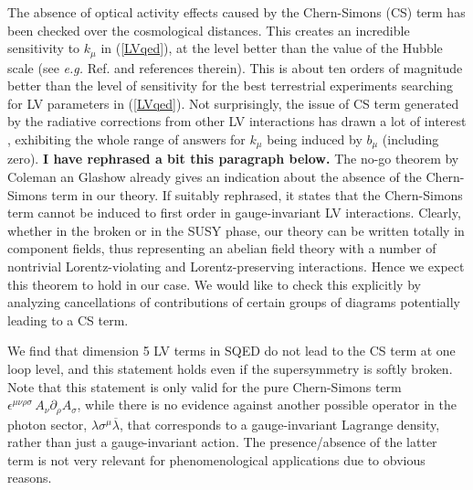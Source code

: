 \documentclass[12pt]{revtex4}
\begin{document}
    The absence of optical activity effects caused by the Chern-Simons (CS) term 
    has been checked over the cosmological distances. This creates an 
    incredible sensitivity to $k_\mu$ in (\ref{LVqed}), at the level better 
    than the value of the Hubble scale (see {\em e.g.} Ref. \cite{CFJ} and references therein). 
   This is about ten orders of magnitude 
    better than the level of sensitivity for the best terrestrial experiments searching for 
    LV parameters in (\ref{LVqed}). Not surprisingly, the issue of 
CS term generated by the radiative corrections from other LV interactions 
    has drawn a lot of interest \cite{CG,Jackiw:1999yp,Chung:1998jv,Andrianov:2001zj}, 
    exhibiting the whole range of answers for $k_\mu$ being induced by $b_\mu$ 
(including zero). 
    {\bf I have rephrased a bit this paragraph below.}
    The no-go theorem by Coleman an Glashow \cite{CG} already gives an indication
    about the absence of the Chern-Simons term in our theory. 
    If suitably rephrased, it states that
    the Chern-Simons term cannot be induced to first order in gauge-invariant
    LV interactions.
    Clearly, whether in the broken or in the SUSY phase, our theory can be written totally
    in component fields, thus representing an abelian field theory with a number of nontrivial
    Lorentz-violating and Lorentz-preserving interactions.
    Hence we expect this theorem 
    to hold in our case. 
    We would like to check this explicitly by analyzing cancellations of contributions
    of certain groups of diagrams potentially leading to a CS term. 

	We find that dimension 5 LV terms in SQED do not lead to the CS term at one loop level,
	and this statement holds even if the supersymmetry is softly broken.
 Note that this statement is only valid for the pure Chern-Simons term
$ \epsilon^{\mu\nu\rho\sigma}\, A_\nu \partial_\rho A_\sigma $, 
while there is no evidence against another possible operator in the 
    photon sector,  $ \lambda \sigma^\mu \overline{\lambda} $,
    that corresponds to a gauge-invariant Lagrange density, rather than just a 
    gauge-invariant action. The presence/absence of the latter term is not very relevant for
phenomenological applications due to obvious reasons. 
\end{document}
